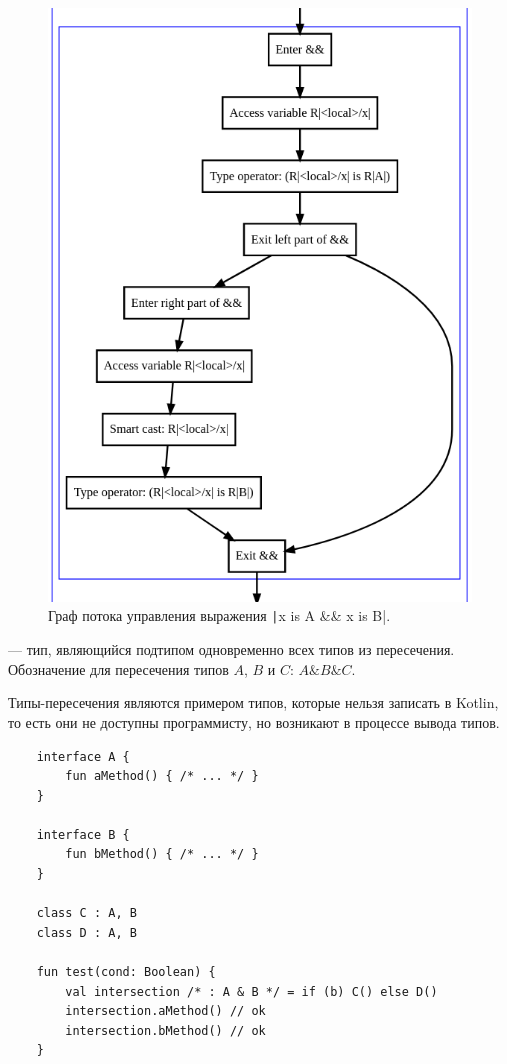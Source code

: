\begin{figure}
    \centering
    \includegraphics[width=0.8\linewidth]{fig/cfgExample}
    \caption{Граф потока управления выражения \texttt|x is A && x is B|.}
    \label{fig:cfg-example}
\end{figure}

\begin{definition}
    \label{def:intersection-types}
     --- тип, являющийся подтипом одновременно всех типов из пересечения.
    Обозначение для пересечения типов $A$, $B$ и $C$: $A \& B \& C$.
\end{definition}

Типы-пересечения являются примером типов, которые нельзя записать в Kotlin, то есть они не доступны программисту, но возникают в процессе вывода типов.
\begin{verbatim}
    interface A {
        fun aMethod() { /* ... */ }
    }

    interface B {
        fun bMethod() { /* ... */ }
    }

    class C : A, B
    class D : A, B

    fun test(cond: Boolean) {
        val intersection /* : A & B */ = if (b) C() else D()
        intersection.aMethod() // ok
        intersection.bMethod() // ok
    }
\end{verbatim}

